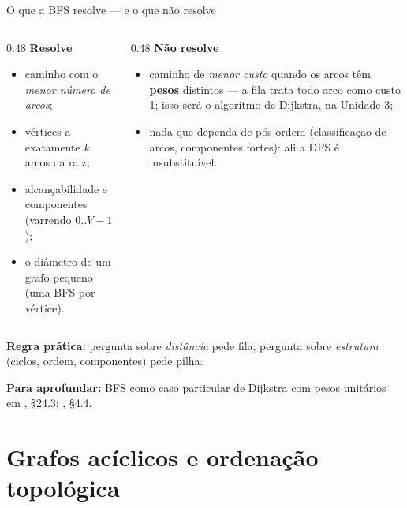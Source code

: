\documentclass[aspectratio=169]{beamer}
\newcommand{\fonte}[1]{%
  \vfill
  {\tiny\color{gray!55!black}\textbf{Para aprofundar:} #1\par}%
}
\begin{document}
\begin{frame}{O que a BFS resolve --- e o que não resolve}
  \begin{columns}[T]
    \begin{column}{0.48\textwidth}
      \textbf{Resolve}

      \medskip
      {\scriptsize
      \begin{itemize}\scriptsize
        \item caminho com o \emph{menor número de arcos};
        \item vértices a exatamente $k$ arcos da raiz;
        \item alcançabilidade e componentes (varrendo $0..V-1$);
        \item o diâmetro de um grafo pequeno (uma BFS por vértice).
      \end{itemize}}
    \end{column}
    \begin{column}{0.48\textwidth}
      \textbf{Não resolve}

      \medskip
      {\scriptsize
      \begin{itemize}\scriptsize
        \item caminho de \emph{menor custo} quando os arcos têm
              \textbf{pesos} distintos --- a fila trata todo arco como
              custo 1; isso será o algoritmo de Dijkstra, na Unidade 3;
        \item nada que dependa de pós-ordem (classificação de arcos,
              componentes fortes): ali a DFS é insubstituível.
      \end{itemize}}
    \end{column}
  \end{columns}
  \medskip
  {\scriptsize \textbf{Regra prática:} pergunta sobre \emph{distância} pede
  fila; pergunta sobre \emph{estrutura} (ciclos, ordem, componentes) pede pilha.}
  \fonte{BFS como caso particular de Dijkstra com pesos unitários em
  \cite{cormen2009introduction}, §24.3; \cite{sedgewick2011algorithms}, §4.4.}
\end{frame}

\section{Grafos acíclicos e ordenação topológica}
\end{document}

